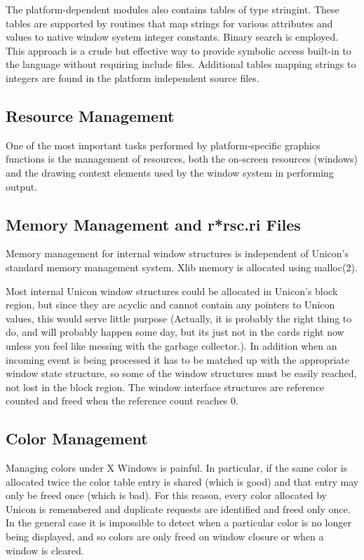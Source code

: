 The platform-dependent modules also contains tables of type
\textsf{stringint}. These tables are supported by routines that map
strings for various attributes and values to native window system
integer constants. Binary search is employed. This approach is a crude
but effective way to provide symbolic access
{\textquotedbl}built-in{\textquotedbl} to the language without
requiring include files. Additional tables mapping strings to
integers are found in the platform independent source files.

\subsection{Resource Management}

One of the most important tasks performed by platform-specific
graphics functions is the management of resources, both the on-screen
resources (windows) and the drawing context elements used by the
window system in performing output.

\subsection[Memory Management and r*rsc.ri Files]{Memory Management and r*rsc.ri Files}

Memory management for internal window structures is independent of
Unicon's standard memory management system. Xlib memory is allocated
using \textsf{malloc(2)}.

Most internal Unicon window structures could be allocated in Unicon's
block region, but since they are acyclic and cannot contain any
pointers to Unicon values, this would serve little purpose (Actually,
it is probably the right thing to do, and will probably happen some
day, but its just not in the cards right now unless you feel like
messing with the garbage collector.). In addition when an incoming
event is being processed it has to be matched up with the appropriate
window state structure, so some of the window structures must be
easily reached, not lost in the block region. The window interface
structures are reference counted and freed when the reference count
reaches 0.

\subsection[Color Management]{Color Management}

Managing colors under X Windows is painful. In particular, if the same
color is allocated twice the color table entry is shared (which is
good) and that entry may only be freed once (which is bad). For this
reason, every color allocated by Unicon is remembered and duplicate
requests are identified and freed only once. In the general case it is
impossible to detect when a particular color is no longer being
displayed, and so colors are only freed on window closure or when a
window is cleared.

